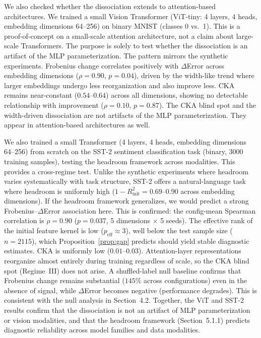 \documentclass[twoside,11pt]{article}
\begin{document}
We also checked whether the dissociation extends to attention-based architectures. We trained a small Vision Transformer (ViT-tiny: 4 layers, 4 heads, embedding dimensions 64--256) on binary MNIST (classes 0 vs.\ 1). This is a proof-of-concept on a small-scale attention architecture, not a claim about large-scale Transformers. The purpose is solely to test whether the dissociation is an artifact of the MLP parameterization. The pattern mirrors the synthetic experiments. Frobenius change correlates positively with $\Delta$Error across embedding dimensions ($\rho=0.90$, $p=0.04$), driven by the width-like trend where larger embeddings undergo less reorganization and also improve less. CKA remains near-constant ($0.54$--$0.64$) across all dimensions, showing no detectable relationship with improvement ($\rho=0.10$, $p=0.87$). The CKA blind spot and the width-driven dissociation are not artifacts of the MLP parameterization. They appear in attention-based architectures as well.

We also trained a small Transformer (4 layers, 4 heads, embedding dimensions 64--256) from scratch on the SST-2 sentiment classification task (binary, 3000 training samples), testing the headroom framework across modalities. This provides a cross-regime test. Unlike the synthetic experiments where headroom varies systematically with task structure, SST-2 offers a natural-language task where headroom is uniformly high ($1-R^2_{\text{init}} = 0.69$--$0.90$ across embedding dimensions). If the headroom framework generalizes, we would predict a strong Frobenius--$\Delta$Error association here. This is confirmed: the config-mean Spearman correlation is $\rho=0.90$ ($p=0.037$, 5 dimensions $\times$ 5 seeds). The effective rank of the initial feature kernel is low ($p_{\text{eff}} \approx 3$), well below the test sample size ($n=2115$), which Proposition~\ref{prop:gap} predicts should yield stable diagnostic estimates. CKA is uniformly low ($0.01$--$0.03$). Attention-layer representations reorganize almost entirely during training regardless of scale, so the CKA blind spot (Regime~III) does not arise. A shuffled-label null baseline confirms that Frobenius change remains substantial ($145\%$ across configurations) even in the absence of signal, while $\Delta$Error becomes negative (performance degrades). This is consistent with the null analysis in Section~4.2. Together, the ViT and SST-2 results confirm that the dissociation is not an artifact of MLP parameterization or vision modalities, and that the headroom framework (Section~5.1.1) predicts diagnostic reliability across model families and data modalities.
\end{document}

